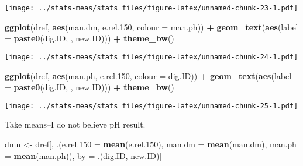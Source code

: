 \documentclass[
]{article}
\newenvironment{Shaded}{\begin{snugshade}}{\end{snugshade}}
\newcommand{\AttributeTok}[1]{\textcolor[rgb]{0.13,0.29,0.53}{#1}}
\newcommand{\FloatTok}[1]{\textcolor[rgb]{0.00,0.00,0.81}{#1}}
\newcommand{\FunctionTok}[1]{\textcolor[rgb]{0.13,0.29,0.53}{\textbf{#1}}}
\newcommand{\NormalTok}[1]{#1}
\newcommand{\OtherTok}[1]{\textcolor[rgb]{0.56,0.35,0.01}{#1}}
\newcommand{\SpecialCharTok}[1]{\textcolor[rgb]{0.81,0.36,0.00}{\textbf{#1}}}
\newcommand{\StringTok}[1]{\textcolor[rgb]{0.31,0.60,0.02}{#1}}
\begin{document}
\texttt{[image: ../stats-meas/stats\_files/figure-latex/unnamed-chunk-23-1.pdf]}

\begin{Shaded}
\begin{Highlighting}[]
\FunctionTok{ggplot}\NormalTok{(dref, }\FunctionTok{aes}\NormalTok{(man.dm, e.rel}\FloatTok{.150}\NormalTok{, }\AttributeTok{colour =}\NormalTok{ man.ph)) }\SpecialCharTok{+}
  \FunctionTok{geom\_text}\NormalTok{(}\FunctionTok{aes}\NormalTok{(}\AttributeTok{label =} \FunctionTok{paste0}\NormalTok{(dig.ID, }\StringTok{\textquotesingle{}{-}\textquotesingle{}}\NormalTok{, new.ID))) }\SpecialCharTok{+}
  \FunctionTok{theme\_bw}\NormalTok{()}
\end{Highlighting}
\end{Shaded}

\texttt{[image: ../stats-meas/stats\_files/figure-latex/unnamed-chunk-24-1.pdf]}

\begin{Shaded}
\begin{Highlighting}[]
\FunctionTok{ggplot}\NormalTok{(dref, }\FunctionTok{aes}\NormalTok{(man.ph, e.rel}\FloatTok{.150}\NormalTok{, }\AttributeTok{colour =}\NormalTok{ dig.ID)) }\SpecialCharTok{+}
  \FunctionTok{geom\_text}\NormalTok{(}\FunctionTok{aes}\NormalTok{(}\AttributeTok{label =} \FunctionTok{paste0}\NormalTok{(dig.ID, }\StringTok{\textquotesingle{}{-}\textquotesingle{}}\NormalTok{, new.ID))) }\SpecialCharTok{+}
  \FunctionTok{theme\_bw}\NormalTok{()}
\end{Highlighting}
\end{Shaded}

\texttt{[image: ../stats-meas/stats\_files/figure-latex/unnamed-chunk-25-1.pdf]}

Take means--I do not believe pH result.

\begin{Shaded}
\begin{Highlighting}[]
\NormalTok{dmn }\OtherTok{\textless{}{-}}\NormalTok{ dref[, .(}\AttributeTok{e.rel.150 =} \FunctionTok{mean}\NormalTok{(e.rel}\FloatTok{.150}\NormalTok{), }\AttributeTok{man.dm =} \FunctionTok{mean}\NormalTok{(man.dm), }\AttributeTok{man.ph =} \FunctionTok{mean}\NormalTok{(man.ph)),}
\NormalTok{     by }\OtherTok{=}\NormalTok{ .(dig.ID, new.ID)]}
\end{Highlighting}
\end{Shaded}
\end{document}

